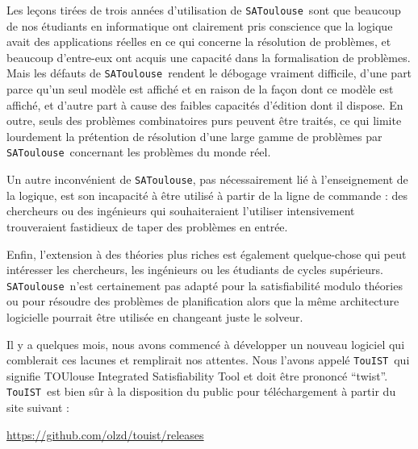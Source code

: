 \documentclass{iaf}
\newcommand{\satoulouse}{{\sc Satoulouse}\xspace}
\renewcommand{\satoulouse}{{\sc \texttt {SAToulouse}}}
\newcommand{\nameTool}{{\sc \texttt {TouIST}}}
\begin{document}
Les le\c cons tir\'{e}es de trois ann\'{e}es d'utilisation de \satoulouse\ sont que beaucoup de nos \'{e}tudiants en informatique ont clairement pris conscience que la logique avait des applications r\'{e}elles en ce qui concerne la r\'{e}solution de probl\`{e}mes, et beaucoup d'entre-eux ont acquis une capacit\'{e} dans la formalisation de probl\`{e}mes. Mais les d\'{e}fauts de \satoulouse\ rendent le d\'{e}bogage vraiment difficile, d'une part parce qu'un seul mod\`{e}le est affich\'{e} et en raison de la fa\c con dont ce mod\`{e}le est affich\'{e}, et d'autre part \`a cause des faibles capacit\'{e}s d'\'{e}dition dont il dispose. En outre, seuls des probl\`{e}mes combinatoires purs peuvent \^{e}tre trait\'{e}s, ce qui limite lourdement la pr\'{e}tention de r\'{e}solution d'une large gamme de probl\`emes par \satoulouse\ concernant les probl\`{e}mes du monde r\'{e}el.

Un autre inconv\'{e}nient de \satoulouse , pas n\'{e}cessairement li\'{e} \`{a} l'enseignement de la logique, est son incapacit\'{e} \`{a} \^{e}tre utilis\'{e} \`{a} partir de la ligne de commande : des chercheurs ou des ing\'{e}nieurs qui souhaiteraient l'utiliser intensivement trouveraient fastidieux de taper des probl\`{e}mes en entr\'{e}e.

Enfin, l'extension \`{a} des th\'{e}ories plus riches est \'egalement quelque-chose qui peut int\'{e}resser les chercheurs, les ing\'{e}nieurs ou les \'{e}tudiants de cycles sup\'{e}rieurs. \satoulouse\ n'est certainement pas adapt\'{e} pour la satisfiabilit\'{e} modulo th\'{e}ories ou pour r\'{e}soudre des probl\`{e}mes de planification alors que la m\^{e}me architecture logicielle pourrait \^{e}tre utilis\'ee en changeant juste le solveur.


Il y a quelques mois, nous avons commenc\'{e} \`{a} d\'{e}velopper un nouveau logiciel qui comblerait ces lacunes et remplirait nos attentes. Nous l'avons appel\'e \nameTool\ qui signifie TOUlouse Integrated Satisfiability Tool et doit \^etre prononc\'e ``twist''.
 \nameTool\ est bien s\^ur \`a la disposition du public pour t\'el\'echargement \`a partir du site suivant :
\begin{center}\url{ https://github.com/olzd/touist/releases }\end{center}
\end{document}
